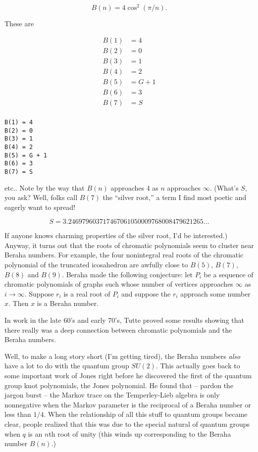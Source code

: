 \documentclass{article}
\begin{document}
\[B(n) = 4 \cos^2(\pi/n).\]

These are

\[\begin{aligned}B(1) &= 4 \\ B(2) &= 0 \\ B(3) &= 1 \\ B(4) &= 2 \\ B(5) &= G+1 \\ B(6) &= 3 \\ B(7) &= S \\ \end{aligned}\]

\begin{verbatim}
B(1) = 4
B(2) = 0
B(3) = 1
B(4) = 2
B(5) = G + 1
B(6) = 3
B(7) = S
\end{verbatim}

etc.. Note by the way that \(B(n)\) approaches 4 as \(n\) approaches
\(\infty\). (What's \(S\), you ask? Well, folks call \(B(7)\) the
``silver root,'' a term I find most poetic and eagerly want to spread!

\[S =  3.246979603717467061050009768008479621265\ldots\]

If anyone knows charming properties of the silver root, I'd be
interested.) Anyway, it turns out that the roots of chromatic
polynomials seem to cluster near Beraha numbers. For example, the four
nonintegral real roots of the chromatic polynomial of the truncated
icosahedron are awfully close to \(B(5)\), \(B(7)\), \(B(8)\) and
\(B(9)\). Beraha made the following conjecture: let \(P_i\) be a
sequence of chromatic polynomials of graphs such whose number of
vertices approaches \(\infty\) as \(i\to\infty\). Suppose \(r_i\) is a
real root of \(P_i\) and suppose the \(r_i\) approach some number \(x\).
Then \(x\) is a Beraha number.

In work in the late 60's and early 70's, Tutte proved some results
showing that there really was a deep connection between chromatic
polynomials and the Beraha numbers.

Well, to make a long story short (I'm getting tired), the Beraha numbers
\emph{also} have a lot to do with the quantum group \(SU(2)\). This
actually goes back to some important work of Jones right before he
discovered the first of the quantum group knot polynomials, the Jones
polynomial. He found that -- pardon the jargon burst -- the Markov trace
on the Temperley-Lieb algebra is only nonnegative when the Markov
parameter is the reciprocal of a Beraha number or less than \(1/4\).
When the relationship of all this stuff to quantum groups became clear,
people realized that this was due to the special natural of quantum
groups when \(q\) is an \(n\)th root of unity (this winds up
corresponding to the Beraha number \(B(n)\).)
\end{document}
